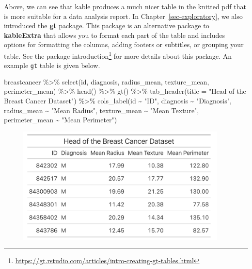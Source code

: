 \documentclass[
  letterpaper,
]{krantz}
\makeatletter
\newenvironment{Shaded}{\begin{snugshade}}{\end{snugshade}}
\newcommand{\AttributeTok}[1]{\textcolor[rgb]{0.40,0.45,0.13}{#1}}
\newcommand{\FunctionTok}[1]{\textcolor[rgb]{0.28,0.35,0.67}{#1}}
\newcommand{\NormalTok}[1]{\textcolor[rgb]{0.00,0.23,0.31}{#1}}
\newcommand{\SpecialCharTok}[1]{\textcolor[rgb]{0.37,0.37,0.37}{#1}}
\newcommand{\StringTok}[1]{\textcolor[rgb]{0.13,0.47,0.30}{#1}}
\renewcommand{\href}[2]{#2\footnote{\url{#1}}}
\newenvironment{kframe}{%
\medskip{}
\setlength{\fboxsep}{.8em}
 \def\at@end@of@kframe{}%
 \ifinner\ifhmode%
  \def\at@end@of@kframe{\end{minipage}}%
  \begin{minipage}{\columnwidth}%
 \fi\fi%
 \def\FrameCommand##1{\hskip\@totalleftmargin \hskip-\fboxsep
 \colorbox{shadecolor}{##1}\hskip-\fboxsep
     \hskip-\linewidth \hskip-\@totalleftmargin \hskip\columnwidth}%
 \MakeFramed {\advance\hsize-\width
   \@totalleftmargin\z@ \linewidth\hsize
   \@setminipage}}%
 {\par\unskip\endMakeFramed%
 \at@end@of@kframe}
\renewenvironment{Shaded}{\begin{kframe}}{\end{kframe}}
\makeatother
\begin{document}
Above, we can see that kable produces a much nicer table in the knitted
pdf that is more suitable for a data analysis report. In
Chapter~\ref{sec-exploratory}, we also introduced the \textbf{gt}
package. This package is an alternative package to \textbf{kableExtra}
that allows you to format each part of the table and includes options
for formatting the columns, adding footers or subtitles, or grouping
your table. See the
\href{https://gt.rstudio.com/articles/intro-creating-gt-tables.html}{package
introduction} for more details about this package. An example
\texttt{gt} table is given below.

\begin{Shaded}
\begin{Highlighting}[]
\NormalTok{breastcancer }\SpecialCharTok{\%\textgreater{}\%} 
  \FunctionTok{select}\NormalTok{(id, diagnosis, radius\_mean, texture\_mean, perimeter\_mean) }\SpecialCharTok{\%\textgreater{}\%} 
  \FunctionTok{head}\NormalTok{() }\SpecialCharTok{\%\textgreater{}\%} 
  \FunctionTok{gt}\NormalTok{() }\SpecialCharTok{\%\textgreater{}\%}
  \FunctionTok{tab\_header}\NormalTok{(}\AttributeTok{title =} \StringTok{"Head of the Breast Cancer Dataset"}\NormalTok{) }\SpecialCharTok{\%\textgreater{}\%}
  \FunctionTok{cols\_label}\NormalTok{(id }\SpecialCharTok{\textasciitilde{}} \StringTok{"ID"}\NormalTok{, }
\NormalTok{             diagnosis }\SpecialCharTok{\textasciitilde{}} \StringTok{"Diagnosis"}\NormalTok{, }
\NormalTok{             radius\_mean }\SpecialCharTok{\textasciitilde{}} \StringTok{"Mean Radius"}\NormalTok{, }
\NormalTok{             texture\_mean }\SpecialCharTok{\textasciitilde{}} \StringTok{"Mean Texture"}\NormalTok{,}
\NormalTok{             perimeter\_mean }\SpecialCharTok{\textasciitilde{}} \StringTok{"Mean Perimeter"}\NormalTok{)}
\end{Highlighting}
\end{Shaded}

\begin{figure}

{\centering \includegraphics[width=4.16667in,height=\textheight]{book/images/12-example-gt.png}

}

\end{figure}
\end{document}
